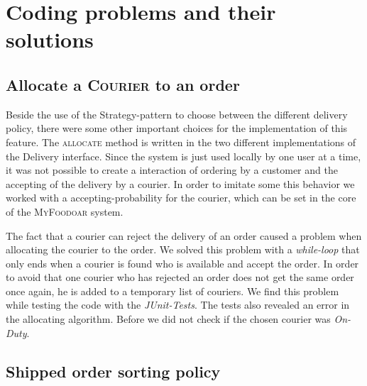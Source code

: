 \section{Coding problems and their solutions}
\label{sec:coding_problems_and_their_solutions}

\subsection{Allocate a \textsc{Courier} to an order}
\label{sub:allocate_a_courier_to_an_order}

Beside the use of the Strategy-pattern to choose between the different delivery policy, there were
some other important choices for the implementation of this feature. The \textsc{allocate} method 
is written in the two different implementations of the Delivery interface. Since the system is 
just used locally by one user at a time, it was not possible to create a interaction of ordering
by a customer and the accepting of the delivery by a courier. In order to imitate some this 
behavior we worked with a accepting-probability for the courier, which can be set in the core of
the \textsc{MyFoodoar} system. 

The fact that a courier can reject the delivery of an order caused a problem when allocating the 
courier to the order. We solved this problem with a \textit{while-loop} that only ends when
a courier is found who is available and accept the order. In order to avoid that one courier who
has rejected an order does not get the same order once again, he is added to a temporary list of
couriers. We find this problem while testing the code with the \textit{JUnit-Tests}. The tests 
also revealed an error in the allocating algorithm. Before we did not check if the chosen 
courier was \textit{On-Duty}.

 

\subsection{Shipped order sorting policy}
\label{sub:shipped_order_sorting_policy}

